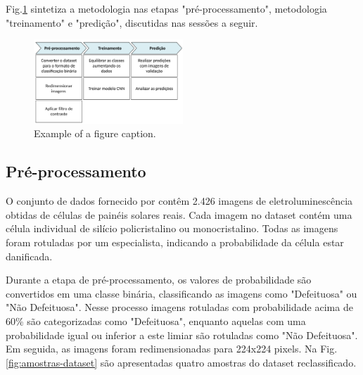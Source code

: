 \documentclass[conference]{IEEEtran}
\begin{document}
Fig.\ref{fig:metodologia} sintetiza a metodologia nas etapas
"pré-processamento", metodologia
"treinamento" e "predição", discutidas nas sessões a seguir.
\begin{figure}[htbp]
    \centerline{\includegraphics[width=0.5\textwidth]{images/metodologia.png}}
    \caption{Example of a figure caption.}
    \label{fig:metodologia}
\end{figure}

\subsection{Pré-processamento}\label{AA}

O conjunto de dados fornecido por \cite{Deitsch2021} contêm 2.426 imagens de
eletroluminescência obtidas de células de painéis
solares reais. Cada imagem no dataset contém uma célula individual de silício
policristalino ou monocristalino. Todas as imagens foram rotuladas por um
especialista,
indicando a probabilidade da célula estar danificada.

Durante a etapa de pré-processamento, os valores de
probabilidade são convertidos em uma classe binária, classificando as imagens
como "Defeituosa" ou "Não Defeituosa". Nesse processo imagens rotuladas com
probabilidade acima de 60\% são categorizadas como "Defeituosa", enquanto
aquelas com uma probabilidade igual ou inferior a este limiar são rotuladas
como "Não Defeituosa". Em seguida, as imagens foram redimensionadas para
224x224 pixels. Na Fig.\ref{fig:amostras-dataset} são apresentadas quatro
amostras do
dataset reclassificado.
\end{document}
